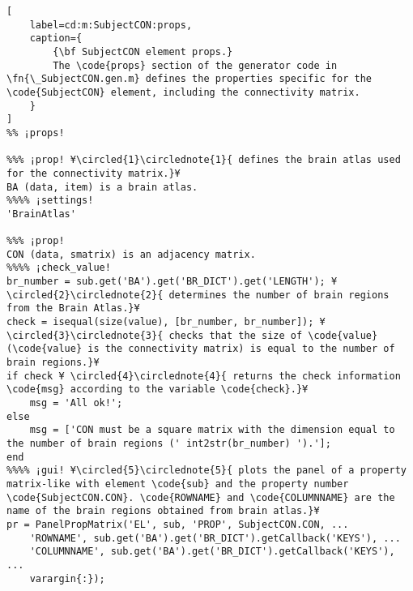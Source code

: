 \documentclass{tufte-handout}
\begin{document}
\begin{lstlisting}[
	label=cd:m:SubjectCON:props,
	caption={
		{\bf SubjectCON element props.}
		The \code{props} section of the generator code in \fn{\_SubjectCON.gen.m} defines the properties specific for the \code{SubjectCON} element, including the connectivity matrix.
	}
]
%% ¡props!

%%% ¡prop! ¥\circled{1}\circlednote{1}{ defines the brain atlas used for the connectivity matrix.}¥
BA (data, item) is a brain atlas.
%%%% ¡settings!
'BrainAtlas'

%%% ¡prop! 
CON (data, smatrix) is an adjacency matrix.
%%%% ¡check_value!
br_number = sub.get('BA').get('BR_DICT').get('LENGTH'); ¥\circled{2}\circlednote{2}{ determines the number of brain regions from the Brain Atlas.}¥
check = isequal(size(value), [br_number, br_number]); ¥ \circled{3}\circlednote{3}{ checks that the size of \code{value} (\code{value} is the connectivity matrix) is equal to the number of brain regions.}¥
if check ¥ \circled{4}\circlednote{4}{ returns the check information \code{msg} according to the variable \code{check}.}¥
    msg = 'All ok!';
else   
    msg = ['CON must be a square matrix with the dimension equal to the number of brain regions (' int2str(br_number) ').'];
end
%%%% ¡gui! ¥\circled{5}\circlednote{5}{ plots the panel of a property matrix-like with element \code{sub} and the property number \code{SubjectCON.CON}. \code{ROWNAME} and \code{COLUMNNAME} are the name of the brain regions obtained from brain atlas.}¥
pr = PanelPropMatrix('EL', sub, 'PROP', SubjectCON.CON, ...
    'ROWNAME', sub.get('BA').get('BR_DICT').getCallback('KEYS'), ...
    'COLUMNNAME', sub.get('BA').get('BR_DICT').getCallback('KEYS'), ...
    varargin{:});
\end{lstlisting}

\clearpage
\end{document}

